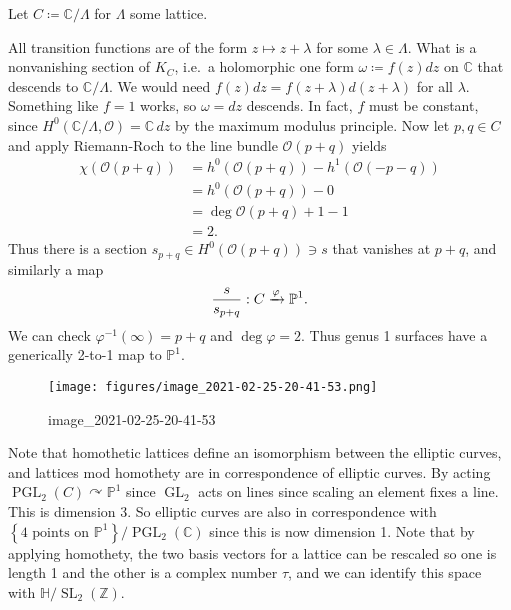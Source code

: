 \begin{example}[?]

Let \(C \coloneqq{\mathbb{C}}/ \Lambda\) for \(\Lambda\) some lattice.

\begin{figure}
\centering
{}
\end{figure}

All transition functions are of the form \(z \mapsto z + \lambda\) for
some \(\lambda\in \Lambda\). What is a nonvanishing section of \(K_C\),
i.e.~a holomorphic one form \(\omega \coloneqq f(z) dz\) on
\({\mathbb{C}}\) that descends to \({\mathbb{C}}/\Lambda\). We would
need \(f(z)dz = f(z + \lambda)d(z+ \lambda)\) for all \(\lambda\).
Something like \(f=1\) works, so \(\omega= dz\) descends. In fact, \(f\)
must be constant, since
\(H^0( {\mathbb{C}}/ \Lambda, {\mathcal{O}}) = {\mathbb{C}}\,dz\) by the
maximum modulus principle. Now let \(p, q\in C\) and apply Riemann-Roch
to the line bundle \({\mathcal{O}}(p+q)\) yields
\begin{align*}
\chi( {\mathcal{O}}(p+q) ) &=
h^0( {\mathcal{O}}(p+q) )-
h^1( {\mathcal{O}}(-p-q) ) \\
&=
h^0( {\mathcal{O}}(p+q) )-0\\
&=
\deg {\mathcal{O}}(p+q)+1-1 \\
&=2
.\end{align*}
Thus there is a section \(s_{p+q} \in H^0( {\mathcal{O}}(p+q)) \ni s\)
that vanishes at \(p+q\), and similarly a map
\begin{align*}
{s\over s_{p+q}}: C \xrightarrow{\varphi} {\mathbb{P}}^1
.\end{align*}
We can check \(\varphi ^{-1} ( \infty ) = p+q\) and
\(\deg \varphi = 2\). Thus genus 1 surfaces have a generically 2-to-1
map to \({\mathbb{P}}^1\).

\begin{figure}
\centering
\texttt{[image: figures/image\_2021-02-25-20-41-53.png]}
\caption{image\_2021-02-25-20-41-53}
\end{figure}

Note that homothetic lattices define an isomorphism between the elliptic
curves, and lattices mod homothety are in correspondence of elliptic
curves. By acting
\(\operatorname{PGL}_2(C) \curvearrowright{\mathbb{P}}^1\) since
\(\operatorname{GL}_2\) acts on lines since scaling an element fixes a
line. This is dimension 3. So elliptic curves are also in correspondence
with
\(\left\{{ 4 \text{ points on } {\mathbb{P}}^1}\right\} / \operatorname{PGL}_2({\mathbb{C}})\)
since this is now dimension 1. Note that by applying homothety, the two
basis vectors for a lattice can be rescaled so one is length 1 and the
other is a complex number \(\tau\), and we can identify this space with
\({\mathbb{H}}/ {\operatorname{SL}}_2({\mathbb{Z}})\).

\end{example}

